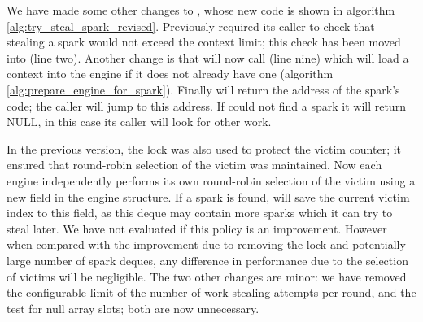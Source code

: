 We have made some other changes to \trystealspark,
whose new code is shown in algorithm \ref{alg:try_steal_spark_revised}.
Previously \trystealspark required its caller to check that stealing a spark
would not exceed the context limit;
this check has been moved into \trystealspark (line two).
Another change is that \trystealspark
will now call \prepareengineforspark (line nine)
which will load a context into the engine if it does not already have one
(algorithm \ref{alg:prepare_engine_for_spark}).
Finally \trystealspark will return the address of the spark's code;
the caller will jump to this address.
If \trystealspark could not find a spark it will return NULL,
in this case its caller will look for other work.

In the previous version,
the lock was also used to protect the victim counter;
it ensured that round-robin selection of the victim was maintained.
Now each engine independently performs its own round-robin selection of the
victim using a new field  in the engine structure.
If a spark is found, \trystealspark will save the current victim index to
this field, as this deque may contain more sparks which it can try to
steal later.
We have not evaluated if this policy is an improvement.
However when compared with the improvement due to removing the lock and
potentially large number of spark deques,
any difference in performance due to the selection of victims will be
negligible.
The two other changes are minor:
we have removed the configurable limit of the number of work stealing
attempts per round,
and the test for null array slots;
both are now unnecessary.


